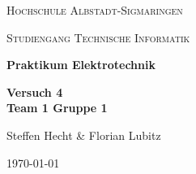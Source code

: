     \begin{titlepage}
        \centering
        {\scshape\LARGE Hochschule Albstadt-Sigmaringen \par}
        {\scshape\large Studiengang Technische Informatik \par}
        \vspace{3cm}
        {\LARGE\bfseries Praktikum Elektrotechnik\par}
        \vspace{2cm}
        {\Huge\bfseries Versuch 4 \\ Team 1 Gruppe 1\par}
        \vspace{1cm}
        {\Large Steffen Hecht \& Florian Lubitz\par}
        \vspace{2cm}
        \vfill

        {\large \today\par}
    \end{titlepage}